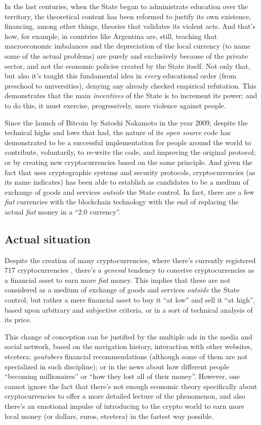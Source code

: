 \documentclass[12pt,a4paper]{article}
\begin{document}
In the last centuries, when the State began to administrate education over the territory, the theoretical content has been reformed to justify its own existence, financing, among other things, theories that validates its violent acts. And that's how, for example, in countries like Argentina are, still, teaching that macroeconomic imbalances and the depreciation of the local currency (to name some of the actual problems) are purely and exclusively because of the private sector, and not the economic policies created by the State itself. Not only that, but also it's taught this fundamental idea in \textit{every} educational order (from preschool to universities), denying any already checked empirical refutation. This demonstrates that the main \textit{incentives} of the State is to increment its power; and to do this, it must exercise, progressively, more violence against people.

Since the launch of Bitcoin by Satoshi Nakamoto in the year 2009, despite the technical highs and lows that had, the nature of its \textit{open source} code has demonstrated to be a successful implementation for people around the world to contribute, voluntarily, to re-write the code, and improving the original protocol; or by creating new cryptocurrencies based on the same principle. And given the fact that uses cryptographic systems and security protocols, cryptocurrencies (as its name indicates) has been able to establish as candidates to be a medium of exchange of goods and services \textit{outside} the State control. In fact, there are a few \textit{fiat} currencies with the blockchain technology with the end of replacing the actual \textit{fiat} money in a “2.0 currency”.

\subsection{Actual situation}
Despite the creation of many cryptocurrencies, where there's currently registered 717 cryptocurrencies \cite{mps}, there's a \textit{general} tendency to conceive cryptocurrencies as a financial asset to earn more \textit{fiat} money. This implies that these are not considered as a medium of exchange of goods and services \textit{outside} the State control; but rather a mere financial asset to buy it “at low” and sell it “at high”, based upon arbitrary and subjective criteria, or in a sort of technical analysis of its price.

This change of conception can be justified by the multiple ads in the media and social network, based on the navigation history, interaction with other websites, etcetera; \textit{youtubers} financial recommendations (although some of them are not specialized in such discipline); or in the news about how different people “becoming millionaires” or “how they lost all of their money”. However, one cannot ignore the fact that there's not enough economic theory specifically about cryptocurrencies to offer a more detailed lecture of the phenomenon, and also there's an emotional impulse of introducing to the crypto world to earn more local money (or dollars, euros, etcetera) in the fastest way possible.
\end{document}
